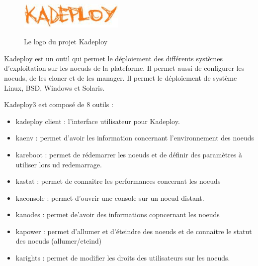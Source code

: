 \documentclass[a4paper, 10pt, onecolumn]{report}
\begin{document}
		\begin{figure}[!h]
			\centering
   			\includegraphics[width=5cm,height=2cm]{kadeploy.jpeg}
   			\caption{Le logo du projet Kadeploy}
    		\label{fig:kadeploy}
		\end{figure} 
			Kadeploy est un outil qui permet le déploiement des différents systèmes d'exploitation sur les noeuds de la plateforme. Il permet aussi de configurer les noeuds, de les cloner et de les manager. Il permet le déploiement de système Linux, BSD, Windows et Solaris.
			
			Kadeploy3 est composé de 8 outils  : \\
				\begin{itemize}
					\item kadeploy client : l'interface utilisateur pour Kadeploy.
					\item kaenv : permet d'avoir les information concernant l'environnement des noeuds 
					\item kareboot : permet de rédemarrer les noeuds et de définir des paramètres à utiliser lors ud redemarrage.
					\item kastat : permet de connaitre les performances concernat les noeuds
					\item kaconsole : permet d'ouvrir une console sur un noeud distant.
					\item kanodes : permet de'avoir des informations copncernant les noeuds 
					\item kapower : permet  d'allumer et d'éteindre des noeuds et de connaitre le statut des noeuds (allumer/eteind)
					\item karights : permet de modifier les droits des utilisateurs sur les noeuds.
				\end{itemize}
\end{document}
